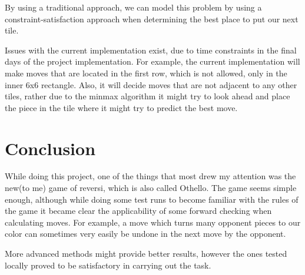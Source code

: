 \documentclass{article}
\begin{document}
By using a traditional approach, we can model this problem by using a constraint-satisfaction approach
	when determining the best place to put our next tile.

Issues with the current implementation exist, due to time constraints in the final days of the project 
	implementation.
For example, the current implementation will make moves that are located in the first row, which is not
	allowed, only in the inner 6x6 rectangle.
Also, it will decide moves that are not adjacent to any other tiles, rather due to the minmax algorithm
	it might try to look ahead and place the piece in the tile where it might try to predict the best move.
\section{Conclusion}
While doing this project, one of the things that most drew my attention was the new(to me) game of reversi,
	which is also called Othello.
The game seems simple enough, although while doing some test runs to become familiar with the rules of the
	game it became clear the applicability of some forward checking when calculating moves. 
For example, a move which turns many opponent pieces to our color can sometimes very easily be undone 
	in the next move by the opponent.

More advanced methods might provide better results, however the ones tested locally proved to be 
	satisfactory in carrying out the task.
\end{document}
